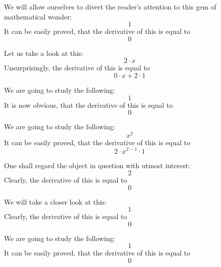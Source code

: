 \documentclass{article}
\begin{document}
We will allow ourselves to divert the reader's attention to this gem of mathematical wonder:
\begin{equation}
1 
\end{equation}
It can be easily proved, that the derivative of this is equal to
\begin{equation}
0 
\end{equation}

Let us take a look at this:
\begin{equation}
2 \cdot x 
\end{equation}
Unsurprisingly, the derivative of this is equal to
\begin{equation}
0 \cdot x + 2 \cdot 1 
\end{equation}

We are going to study the following:
\begin{equation}
1 
\end{equation}
It is now obvious, that the derivative of this is equal to
\begin{equation}
0 
\end{equation}

We are going to study the following:
\begin{equation}
x ^{2 } 
\end{equation}
It can be easily proved, that the derivative of this is equal to
\begin{equation}
2 \cdot x ^{2 - 1 } \cdot 1 
\end{equation}

One shall regard the object in question with utmost interest:
\begin{equation}
2 
\end{equation}
Clearly, the derivative of this is equal to
\begin{equation}
0 
\end{equation}

We will take a closer look at this:
\begin{equation}
1 
\end{equation}
Clearly, the derivative of this is equal to
\begin{equation}
0 
\end{equation}

We are going to study the following:
\begin{equation}
1 
\end{equation}
It can be easily proved, that the derivative of this is equal to
\begin{equation}
0 
\end{equation}
\end{document}
